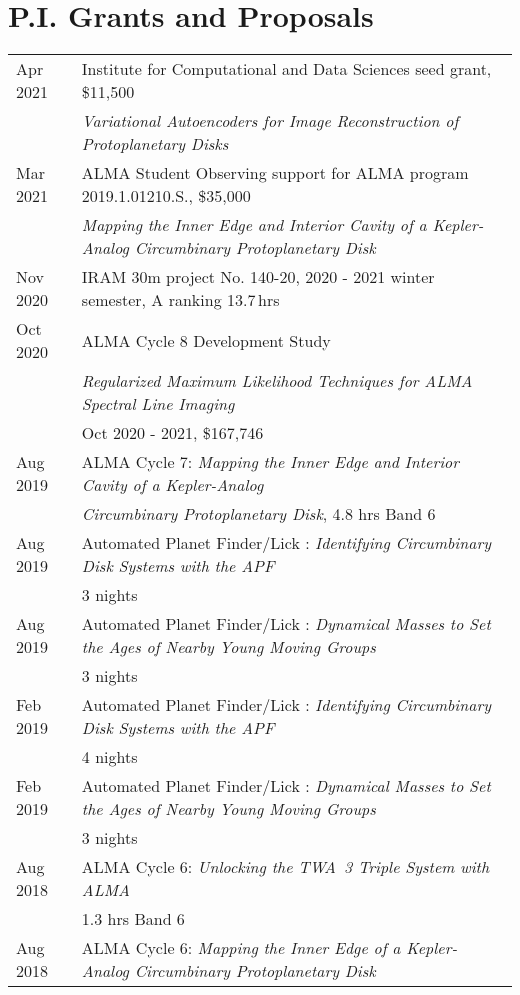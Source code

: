 \section*{P.I. Grants and Proposals}
\begin{tabular*}{\textwidth}{@{\hspace{10pt}}p{1.2in}l}
  Apr 2021 & Institute for Computational and Data Sciences seed grant, \$11,500\\
  & \emph{Variational Autoencoders for Image Reconstruction of Protoplanetary Disks} \\
  Mar 2021 & ALMA Student Observing support for ALMA program 2019.1.01210.S., \$35,000 \\
  & \emph{Mapping the Inner Edge and Interior Cavity of a Kepler-Analog Circumbinary Protoplanetary Disk} \\
  Nov 2020 & IRAM 30m project No. 140-20, 2020 - 2021 winter semester, A ranking 13.7\,hrs \\ 
  Oct 2020 & ALMA Cycle 8 Development Study\\
  & \emph{Regularized Maximum Likelihood Techniques for ALMA Spectral Line Imaging} \\
  & Oct 2020 - 2021, \$167,746 \\
  Aug 2019 & ALMA Cycle 7: \emph{Mapping the Inner Edge and Interior Cavity of a Kepler-Analog}\\
  & \emph{Circumbinary Protoplanetary Disk}, 4.8 hrs Band 6\\
  Aug 2019 & Automated Planet Finder/Lick : \emph{Identifying Circumbinary Disk Systems with the APF} \\
  & 3 nights \\
  Aug 2019 & Automated Planet Finder/Lick : \emph{Dynamical Masses to Set the Ages of Nearby Young Moving Groups} \\
  & 3 nights \\
  Feb 2019 & Automated Planet Finder/Lick : \emph{Identifying Circumbinary Disk Systems with the APF} \\
  & 4 nights \\
  Feb 2019 & Automated Planet Finder/Lick : \emph{Dynamical Masses to Set the Ages of Nearby Young Moving Groups} \\
  & 3 nights \\
  Aug 2018 & ALMA Cycle 6: \emph{Unlocking the TWA~3 Triple System with ALMA}\\
  & 1.3 hrs Band 6\\
  Aug 2018 & ALMA Cycle 6: \emph{Mapping the Inner Edge of a Kepler-Analog Circumbinary Protoplanetary Disk}\\

\end{tabular*}
